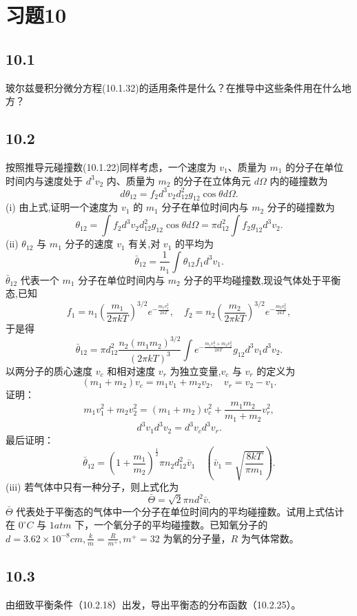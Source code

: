 \section{习题10}

\newpage
\subsection{10.1}
玻尔兹曼积分微分方程(10.1.32)的适用条件是什么？在推导中这些条件用在什么地方？

\newpage
\subsection{10.2}
按照推导元碰撞数(10.1.22)同样考虑，一个速度为 $v_1$、质量为 $m_1$ 的分子在单位时间内与速度处于 $d^3v_2$ 内、质量为 $m_2$ 的分子在立体角元 $d\Omega$ 内的碰撞数为
$$d\theta_{12} = f_2 d^3v_2 d^2_{12}g_{12}\cos\theta d\Omega.$$
(i) 由上式,证明一个速度为 $v_1$ 的 $m_1$ 分子在单位时间内与 $m_2$ 分子的碰撞数为
$$\theta_{12} = \int f_2 d^3v_2 d^2_{12}g_{12}\cos\theta d\Omega = \pi d^2_{12} \int f_2 g_{12} d^3v_2.$$
(ii) $\theta_{12}$ 与 $m_1$ 分子的速度 $v_1$ 有关,对 $v_1$ 的平均为
$$\bar{\theta}_{12} = \frac{1}{n_1} \int \theta_{12} f_1 d^3v_1.$$
$\bar{\theta}_{12}$ 代表一个 $m_1$ 分子在单位时间内与 $m_2$ 分子的平均碰撞数,现设气体处于平衡态,已知
$$f_1 = n_1 \left( \frac{m_1}{2\pi kT} \right)^{3/2} e^{-\frac{m_1 v_1^2}{2kT}}, \quad f_2 = n_2 \left( \frac{m_2}{2\pi kT} \right)^{3/2} e^{-\frac{m_2 v_2^2}{2kT}},$$
于是得
$$\bar{\theta}_{12} = \pi d^2_{12} \frac{n_2 (m_1 m_2)^{3/2}}{(2\pi kT)^3} \int e^{-\frac{m_1 v_1^2 + m_2 v_2^2}{2kT}} g_{12} d^3v_1 d^3v_2.$$
以两分子的质心速度 $v_c$ 和相对速度 $v_r$ 为独立变量,$v_c$ 与 $v_r$ 的定义为
$$(m_1 + m_2) v_c = m_1 v_1 + m_2 v_2, \quad v_r = v_2 - v_1.$$
证明：
$$m_1 v_1^2 + m_2 v_2^2 = (m_1 + m_2) v_c^2 + \frac{m_1 m_2}{m_1 + m_2} v_r^2,$$
$$d^3v_1 d^3v_2 = d^3v_c d^3v_r.$$
最后证明：
$$\bar{\theta}_{12} = \left( 1 + \frac{m_1}{m_2} \right)^{\frac{1}{2}} \pi n_2 d_{12}^2 \bar{v}_1 \quad (\bar{v}_1 = \sqrt{\frac{8kT}{\pi m_1}}).$$
(iii) 若气体中只有一种分子，则上式化为
$$\bar{\Theta} = \sqrt{2}\pi nd^2 \bar{v}.$$
$\bar{\Theta}$ 代表处于平衡态的气体中一个分子在单位时间内的平均碰撞数。试用上式估计在 $0^\circ C$ 与 $1 atm$ 下，一个氧分子的平均碰撞数。已知氧分子的 $d=3.62 \times 10^{-8} cm, \frac{k}{m} = \frac{R}{m^+}, m^+=32$ 为氧的分子量，$R$ 为气体常数。

\newpage
\subsection{10.3}
由细致平衡条件（10.2.18）出发，导出平衡态的分布函数（10.2.25）。

